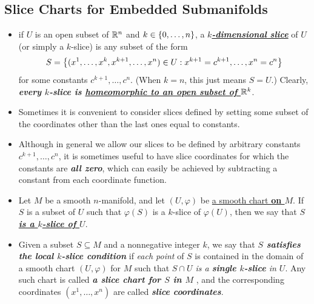 \documentclass[11pt]{article}
\begin{document}
\subsection{Slice Charts for Embedded Submanifolds}
\begin{itemize}
\item \begin{definition}
if $U$ is an open subset of ${\mathbb R}^n$ and $k\in \left\{0,\ldots,n\right\}$, a \underline{\emph{\textbf{$k$-dimensional slice}}} of $U$ (or simply a $k$-slice) is any subset of the form 
\begin{align*}
S = \left\{(x^1,\ldots,x^k, x^{k+1},\ldots, x^n) \in U: x^{k+1} = c^{k+1},\ldots, x^n = c^n\right\}
\end{align*} for some constants $c^{k+1},\ldots,c^n$. (When $k = n$, this just means $S = U$.)  Clearly, \emph{\textbf{every $k$-slice is \underline{homeomorphic to an open subset of ${\mathbb R}^k$}}}. 
\end{definition}

\item \begin{remark}
Sometimes it is convenient to consider slices defined by setting some subset of the coordinates other than the last ones equal to constants.
\end{remark}

\item \begin{remark}
Although in general we allow our slices to be defined by arbitrary constants $c^{k+1},\ldots,c^n$, it is sometimes useful to have slice coordinates for which the constants are \emph{\textbf{all zero}}, which can easily be achieved by subtracting a constant from each coordinate function.
\end{remark}

\item \begin{definition}
Let $M$ be a smooth $n$-manifold, and let $(U, \varphi)$ be \underline{a smooth chart \textbf{on $M$}}. If $S$ is a subset of $U$ such that $\varphi(S)$ is a $k$-slice of $\varphi(U)$, then we say that \underline{\emph{\textbf{$S$ is a $k$-slice of $U$}}}. 
\end{definition}

\item \begin{definition}
Given a subset $S \subseteq M$ and a nonnegative integer $k$, we say that \emph{\textbf{$S$ satisfies the local $k$-slice condition}} if \emph{each point} of $S$ is contained
in the domain of a smooth chart  $(U, \varphi)$ for $M$ such that \emph{\underline{$S \cap U$} is a \textbf{single $k$-slice} in $U$}. Any such chart is called \emph{\textbf{a slice chart for $S$ in $M$}} , and the corresponding coordinates $(x^1,\ldots,x^n)$ are called \emph{\textbf{slice coordinates}}.
\end{definition}


\end{itemize}
\end{document}
